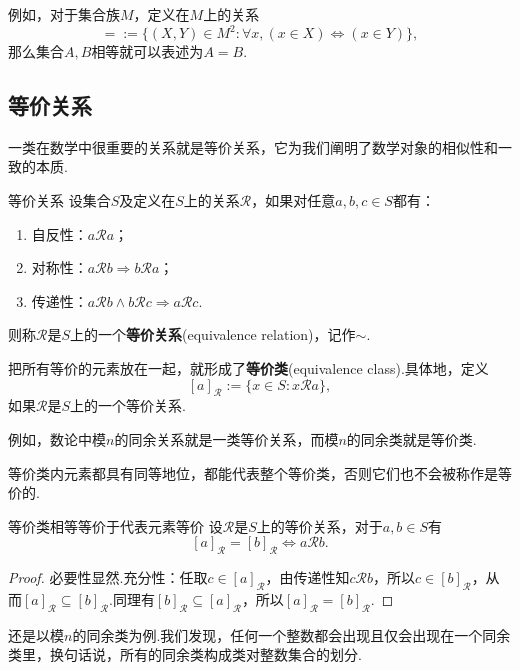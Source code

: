 \documentclass[lang=cn, zihao=5]{elegantbook}
\begin{document}
例如，对于集合族$M$，定义在$M$上的关系$$\boldsymbol{=} := \{ (X,Y) \in M^2 : \forall x,(x \in X) \Leftrightarrow (x \in Y) \},$$
那么集合$A,B$相等就可以表述为$A \boldsymbol{=} B$.

\subsection{等价关系}

一类在数学中很重要的关系就是等价关系，它为我们阐明了数学对象的相似性和一致的本质.

\begin{definition}{等价关系}
	设集合$S$及定义在$S$上的关系$\mathcal{R}$，如果对任意$a,b,c \in S$都有：
	\begin{enumerate}
		\item 自反性：$a\mathcal{R} a$；
		\item 对称性：$a\mathcal{R} b \Rightarrow b\mathcal{R} a$；
		\item 传递性：$a\mathcal{R} b \wedge b\mathcal{R} c \Rightarrow a\mathcal{R} c$.
	\end{enumerate}
	则称$\mathcal{R}$是$S$上的一个\textbf{等价关系}(equivalence relation)，记作$\sim$.
\end{definition}

把所有等价的元素放在一起，就形成了\textbf{等价类}(equivalence class).具体地，定义$$[a]_{\mathcal{R}} := \{ x \in S:x\mathcal{R}a \},$$如果$\mathcal{R}$是$S$上的一个等价关系.

例如，数论中模$n$的同余关系就是一类等价关系，而模$n$的同余类就是等价类.

等价类内元素都具有同等地位，都能代表整个等价类，否则它们也不会被称作是等价的.

\begin{proposition}{等价类相等等价于代表元素等价}
	设$\mathcal{R}$是$S$上的等价关系，对于$a,b \in S$有$$[a]_{\mathcal{R}} = [b]_{\mathcal{R}} \Leftrightarrow a\mathcal{R} b.$$
\end{proposition}
\begin{proof}
	必要性显然.充分性：任取$c \in [a]_{\mathcal{R}}$，由传递性知$c \mathcal{R} b$，所以$c \in [b]_{\mathcal{R}}$，从而$[a]_{\mathcal{R}} \subseteq [b]_{\mathcal{R}}$.同理有$[b]_{\mathcal{R}} \subseteq [a]_{\mathcal{R}}$，所以$[a]_{\mathcal{R}} = [b]_{\mathcal{R}}$.
\end{proof}

还是以模$n$的同余类为例.我们发现，任何一个整数都会出现且仅会出现在一个同余类里，换句话说，所有的同余类构成类对整数集合的划分.
\end{document}
